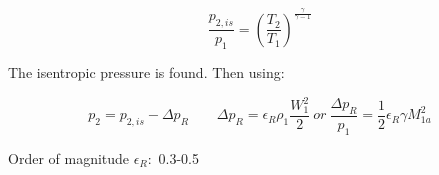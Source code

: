 \begin{equation}
\frac{p_{2,is}}{p_1} = \left(\frac{T_2}{T_1}\right)^{\frac{\gamma }{\gamma -1}}
\end{equation}

The isentropic pressure is found. Then using:

\begin{equation}
p_2 = p_{2,is} - \Delta p_R \qquad \Delta p_R= \epsilon _R \rho _1  \frac{W_1^2}{2} \ or \ \frac{\Delta p_R}{p_1} = \frac{1}{2} \epsilon _R \gamma M_{1a}^2
\end{equation}

Order of magnitude $\epsilon _R:$ 0.3-0.5